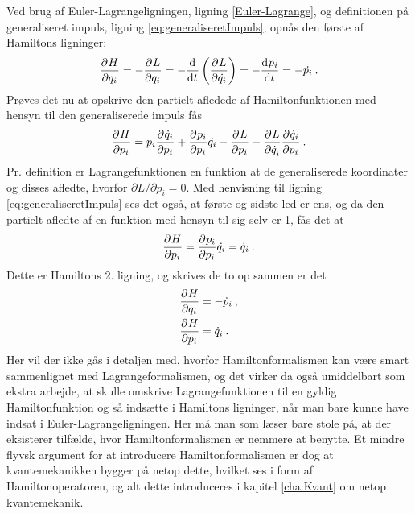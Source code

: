 Ved brug af Euler-Lagrangeligningen, ligning \eqref{Euler-Lagrange}, og definitionen på generaliseret impuls, ligning \eqref{eq:generaliseretImpuls}, opnås den første af Hamiltons ligninger:
%
\begin{align}
	\pdif{q_i}{H} = -\pdif{q_i}{L} = -\el{\dt{q_i}} = -\dif{t}{p_i} = -\dt{p_i} \: .
\end{align}
%
Prøves det nu at opskrive den partielt afledede af Hamiltonfunktionen med hensyn til den generaliserede impuls fås
%
\begin{align}
	\pdif{p_i}{H} = p_i\pdif{p_i}{\dt{q}_i} + \pdif{p_i}{p_i}\dt{q_i} - \pdif{p_i}{L} - \pdif{\dt{q}_i}{L}\pdif{p_i}{\dt{q}_i} \: .
\end{align}
%
Pr. definition er Lagrangefunktionen en funktion at de generaliserede koordinater og disses afledte, hvorfor $\partial L/\partial p_i = 0$. Med henvisning til ligning \eqref{eq:generaliseretImpuls} ses det også, at første og sidste led er ens, og da den partielt afledte af en funktion med hensyn til sig selv er 1, fås det at
%
\begin{align}
	\pdif{p_i}{H} = \pdif{p_i}{p_i}\dt{q_i} =  \dt{q}_i \: .
\end{align}
%
Dette er Hamiltons 2. ligning, og skrives de to op sammen er det
%
\begin{equation}
\begin{aligned}
	\pdif{q_i}{H} &=  -\dt{p}_i \: , \\
	\pdif{p_i}{H} &=  \dt{q}_i \: .
\end{aligned}
\end{equation}
%
Her vil der ikke gås i detaljen med, hvorfor Hamiltonformalismen kan være smart sammenlignet med Lagrangeformalismen, og det virker da også umiddelbart som ekstra arbejde, at skulle omskrive Lagrangefunktionen til en gyldig Hamiltonfunktion og så indsætte i Hamiltons ligninger, når man bare kunne have indsat i Euler-Lagrangeligningen. Her må man som læser bare stole på, at der eksisterer tilfælde, hvor Hamiltonformalismen er nemmere at benytte. Et mindre flyvsk argument for at introducere Hamiltonformalismen er dog at kvantemekanikken bygger på netop dette, hvilket ses i form af Hamiltonoperatoren, og alt dette introduceres i kapitel \ref{cha:Kvant} om netop kvantemekanik.


